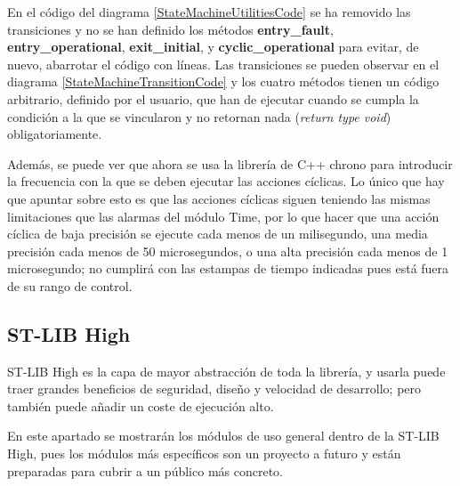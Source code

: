 \documentclass{report}
\begin{document}
En el código del diagrama \ref{StateMachineUtilitiesCode} se ha removido las transiciones y no se han definido los métodos \textbf{entry\_fault}, \textbf{entry\_operational}, \textbf{exit\_initial}, y \textbf{cyclic\_operational} para evitar, de nuevo, abarrotar el código con líneas. Las transiciones se pueden observar en el diagrama \ref{StateMachineTransitionCode} y los cuatro métodos tienen un código arbitrario, definido por el usuario, que han de ejecutar cuando se cumpla la condición a la que se vincularon y no retornan nada (\textit{return type void}) obligatoriamente. 
\par \vspace{0.3cm}
Además, se puede ver que ahora se usa la librería de C++ chrono para introducir la frecuencia con la que se deben ejecutar las acciones cíclicas. Lo único que hay que apuntar sobre esto es que las acciones cíclicas siguen teniendo las mismas limitaciones que las alarmas del módulo Time, por lo que hacer que una acción cíclica de baja precisión se ejecute cada menos de un milisegundo, una media precisión cada menos de 50 microsegundos, o una alta precisión cada menos de 1 microsegundo; no cumplirá con las estampas de tiempo indicadas pues está fuera de su rango de control. 

\subsection{ST-LIB High}
ST-LIB High es la capa de mayor abstracción de toda la librería, y usarla puede traer grandes beneficios de seguridad, diseño y velocidad de desarrollo; pero también puede añadir un coste de ejecución alto.
\par
En este apartado se mostrarán los módulos de uso general dentro de la ST-LIB High, pues los módulos más específicos son un proyecto a futuro y están preparadas para cubrir a un público más concreto. 
\end{document}
